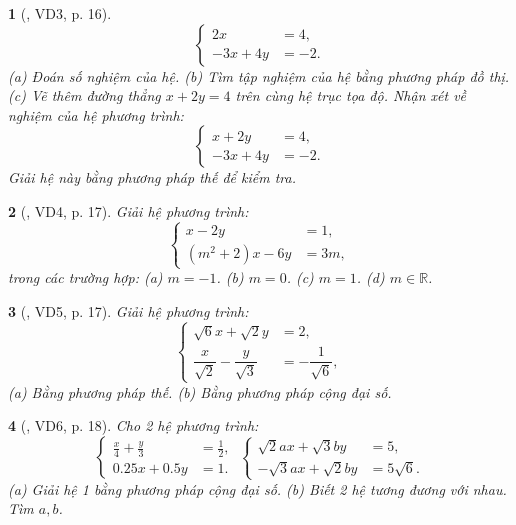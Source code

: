 \documentclass{article}
\newtheorem{baitoan}{}
\begin{document}
\begin{baitoan}[\cite{Binh_boi_duong_Toan_9_tap_2}, VD3, p. 16]
	\begin{equation*}
		\left\{\begin{split}
			2x &= 4,\\
			-3x + 4y &= -2.
		\end{split}\right.
	\end{equation*}
	(a) Đoán số nghiệm của hệ. (b) Tìm tập nghiệm của hệ bằng phương pháp đồ thị. (c) Vẽ thêm đường thẳng $x + 2y = 4$ trên cùng hệ trục tọa độ. Nhận xét về nghiệm của hệ phương trình:
	\begin{equation*}
		\left\{\begin{split}
			x + 2y &= 4,\\
			-3x + 4y &= -2.
		\end{split}\right.
	\end{equation*}
	Giải hệ này bằng phương pháp thế để kiểm tra.
\end{baitoan}

\begin{baitoan}[\cite{Binh_boi_duong_Toan_9_tap_2}, VD4, p. 17]
	Giải hệ phương trình:
	\begin{equation*}
		\left\{\begin{split}
			x - 2y &= 1,\\
			(m^2 + 2)x - 6y &= 3m,
		\end{split}\right.
	\end{equation*}
	trong các trường hợp: (a) $m = -1$. (b) $m = 0$. (c) $m = 1$. (d) $m\in\mathbb{R}$.
\end{baitoan}

\begin{baitoan}[\cite{Binh_boi_duong_Toan_9_tap_2}, VD5, p. 17]
	Giải hệ phương trình:
	\begin{equation*}
		\left\{\begin{split}
			\sqrt{6}x + \sqrt{2}y &= 2,\\
			\dfrac{x}{\sqrt{2}} - \dfrac{y}{\sqrt{3}} &= -\dfrac{1}{\sqrt{6}},
		\end{split}\right.
	\end{equation*}
	(a) Bằng phương pháp thế. (b) Bằng phương pháp cộng đại số.
\end{baitoan}

\begin{baitoan}[\cite{Binh_boi_duong_Toan_9_tap_2}, VD6, p. 18]
	Cho 2 hệ phương trình:
	\begin{equation*}
		\left\{\begin{split}
			\frac{x}{4} + \frac{y}{3} &= \frac{1}{2},\\
			0.25x + 0.5y &= 1.
		\end{split}\right.\ 
		\left\{\begin{split}
			\sqrt{2}ax + \sqrt{3}by &= 5,\\
			-\sqrt{3}ax + \sqrt{2}by &= 5\sqrt{6}.
		\end{split}\right.
	\end{equation*}
	(a) Giải hệ 1 bằng phương pháp cộng đại số. (b) Biết 2 hệ tương đương với nhau. Tìm $a,b$.
\end{baitoan}
\end{document}
